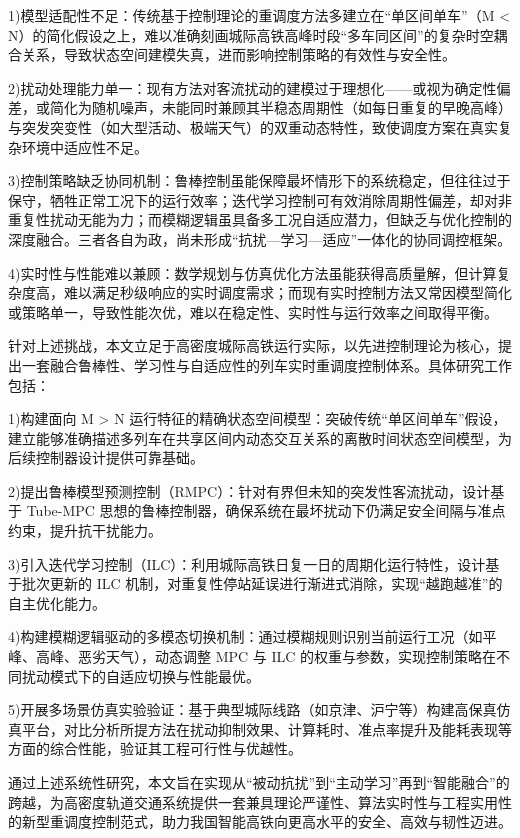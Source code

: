 1)模型适配性不足：传统基于控制理论的重调度方法多建立在“单区间单车”（M < N）的简化假设之上，难以准确刻画城际高铁高峰时段“多车同区间”的复杂时空耦合关系，导致状态空间建模失真，进而影响控制策略的有效性与安全性。

2)扰动处理能力单一：现有方法对客流扰动的建模过于理想化——或视为确定性偏差，或简化为随机噪声，未能同时兼顾其半稳态周期性（如每日重复的早晚高峰）与突发突变性（如大型活动、极端天气）的双重动态特性，致使调度方案在真实复杂环境中适应性不足。

3)控制策略缺乏协同机制：鲁棒控制虽能保障最坏情形下的系统稳定，但往往过于保守，牺牲正常工况下的运行效率；迭代学习控制可有效消除周期性偏差，却对非重复性扰动无能为力；而模糊逻辑虽具备多工况自适应潜力，但缺乏与优化控制的深度融合。三者各自为政，尚未形成“抗扰—学习—适应”一体化的协同调控框架。

4)实时性与性能难以兼顾：数学规划与仿真优化方法虽能获得高质量解，但计算复杂度高，难以满足秒级响应的实时调度需求；而现有实时控制方法又常因模型简化或策略单一，导致性能次优，难以在稳定性、实时性与运行效率之间取得平衡。

针对上述挑战，本文立足于高密度城际高铁运行实际，以先进控制理论为核心，提出一套融合鲁棒性、学习性与自适应性的列车实时重调度控制体系。具体研究工作包括：

1)构建面向 M > N 运行特征的精确状态空间模型：突破传统“单区间单车”假设，建立能够准确描述多列车在共享区间内动态交互关系的离散时间状态空间模型，为后续控制器设计提供可靠基础。

2)提出鲁棒模型预测控制（RMPC）：针对有界但未知的突发性客流扰动，设计基于 Tube-MPC 思想的鲁棒控制器，确保系统在最坏扰动下仍满足安全间隔与准点约束，提升抗干扰能力。

3)引入迭代学习控制（ILC）：利用城际高铁日复一日的周期化运行特性，设计基于批次更新的 ILC 机制，对重复性停站延误进行渐进式消除，实现“越跑越准”的自主优化能力。

4)构建模糊逻辑驱动的多模态切换机制：通过模糊规则识别当前运行工况（如平峰、高峰、恶劣天气），动态调整 MPC 与 ILC 的权重与参数，实现控制策略在不同扰动模式下的自适应切换与性能最优。

5)开展多场景仿真实验验证：基于典型城际线路（如京津、沪宁等）构建高保真仿真平台，对比分析所提方法在扰动抑制效果、计算耗时、准点率提升及能耗表现等方面的综合性能，验证其工程可行性与优越性。

通过上述系统性研究，本文旨在实现从“被动抗扰”到“主动学习”再到“智能融合”的跨越，为高密度轨道交通系统提供一套兼具理论严谨性、算法实时性与工程实用性的新型重调度控制范式，助力我国智能高铁向更高水平的安全、高效与韧性迈进。


